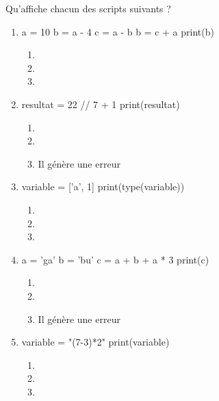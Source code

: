 \documentclass[a4paper,10pt]{article}
\begin{document}

Qu'affiche chacun des scripts suivants ?
\begin{multicols}{2}
\begin{enumerate}[\bfseries 1.]
\item 

\begin{python}
a = 10 
b = a - 4 
c = a - b
b = c + a
print(b)
\end{python}
\begin{enumerate}[\case\ \ a.]
\item {}
\item {}
\item {}
\end{enumerate}	

\item 	
\begin{python}
resultat = 22 // 7 + 1
print(resultat)
\end{python}
\begin{enumerate}[\case\ \ a.]
\item {}
\item {}
\item Il génère une erreur
\end{enumerate}	

\item 
\begin{python}
variable = ['a', 1]
print(type(variable))
\end{python}
\begin{enumerate}[\case\ \ a.]
\item 	{}
\item 	{}
\item 	{}

\end{enumerate}	

\item 
\begin{python}
a = 'ga'
b = 'bu'
c = a + b  + a * 3
print(c)
\end{python}
\begin{enumerate}[\case\ \ a.]
\item 	{}
\item 	{}
\item 	Il génère une erreur
\end{enumerate}	

\item 
\begin{python}
variable = "(7-3)*2"
print(variable)
\end{python}
\begin{enumerate}[\case\ \ a.]
\item 	{}
\item 	{}
\item 	{}
\end{enumerate}	


\end{enumerate}
\end{multicols}
\end{document}
